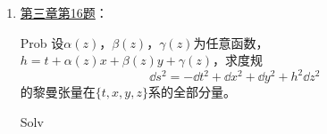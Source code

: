 \begin{xiti}
\begin{jie}
\begin{enumerate}
\begin{yl}{Solv}
\begin{enumerate}[leftmargin=2em]
\begin{align*}
	        	    \tensor{R}{_{(3)(0)(3)}^{(0)}} &= - \tensor{R}{_{(0)(3)(3)}^{(0)}} = - \frac{1}{4} z^{-\frac{3}{2}} \\ \displaybreak[1]
	        	    \tensor{R}{_{(3)(1)(1)}^{(3)}} &= - \tensor{R}{_{(1)(3)(1)}^{(3)}} = \frac{1}{8} z^{-\frac{3}{2}} \\
	        	    \tensor{R}{_{(3)(2)(3)}^{(2)}} &= - \tensor{R}{_{(2)(3)(3)}^{(2)}} = \frac{1}{8} z^{-\frac{3}{2}}
	        	    \end{align*}
	        	    \item[{\heiti 验证}] 根据
	        	    \begin{align*}
	        	    \tensor{\left(e^0\right)}{_a} &= \frac{1}{\sqrt[4]{z}} \tensor{\left(\dd{t}\right)}{_a} \\
	        	    \tensor{\left(e^1\right)}{_a} &= \sqrt{z} \tensor{\left(\dd{x}\right)}{_a} \\
	        	    \tensor{\left(e^2\right)}{_a} &= \sqrt{z} \tensor{\left(\dd{y}\right)}{_a} \\
	        	    \tensor{\left(e^3\right)}{_a} &= \frac{1}{\sqrt[4]{z}} \tensor{\left(\dd{z}\right)}{_a} 
	        	    \end{align*}
	        	    和
	        	    \begin{align*}
	        	    \tensor{\left(e_0\right)}{^a} &= \sqrt[4]{z} \tensor{\left(\pdv{t}\right)}{^a} \\
	        	    \tensor{\left(e_1\right)}{^a} &= \frac{1}{\sqrt{z}} \tensor{\left(\pdv{x}\right)}{^a}\\
	        	    \tensor{\left(e_2\right)}{^a} &= \frac{1}{\sqrt{z}} \tensor{\left(\pdv{y}\right)}{^a} \\
	        	    \tensor{\left(e_3\right)}{^a} &= \sqrt[4]{z} \tensor{\left(\pdv{z}\right)}{^a}
	        	    \end{align*}
	        	    ……懒得验证了
	        	\end{enumerate}
	        \end{yl}
            \item \hyperlink{3.16}{第三章第16题}：
            \begin{yl}{Prob}
            	设$\alpha(z)$，$\beta(z)$，$\gamma(z)$为任意函数，$h=t+ \alpha(z)x+\beta(z)y+\gamma(z) $，求度规\[ \dd{s}^2= -\dd{t}^2 + \dd{x}^2 +\dd{y}^2 +h^2\dd{z}^2 \] 的黎曼张量在$\{t,x,y,z\}$系的全部分量。
            \end{yl}
            \begin{yl}{Solv}
            	\begin{enumerate}[leftmargin=2em]

\end{enumerate}
\end{yl}
\end{enumerate}
\end{jie}
\end{xiti}
